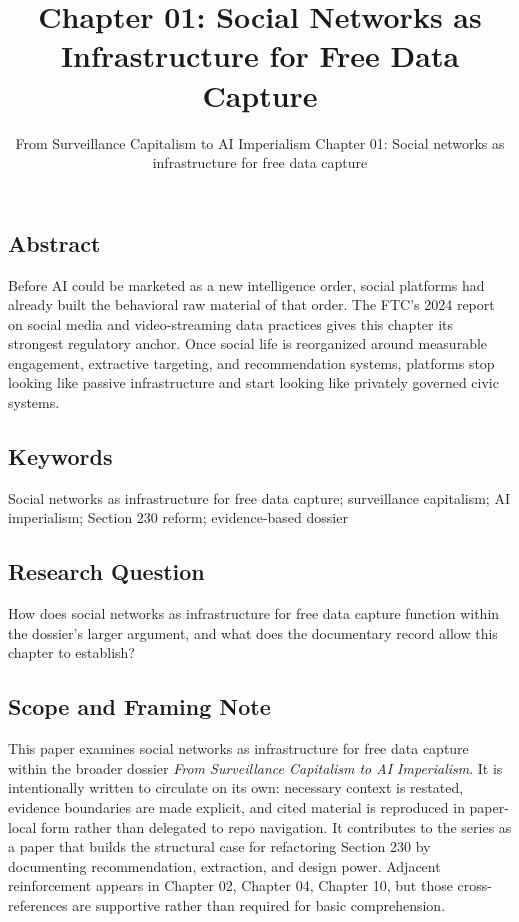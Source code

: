 \documentclass[
  american,
  11pt,
  letterpaper,
]{article}
\title{Chapter 01: Social Networks as Infrastructure for Free Data
Capture}
\subtitle{From Surveillance Capitalism to AI Imperialism \textbar{}
Chapter 01: Social networks as infrastructure for free data capture}
\author{}
\date{}
\begin{document}
\maketitle

\subsection{Abstract}\label{abstract}

Before AI could be marketed as a new intelligence order, social
platforms had already built the behavioral raw material of that order.
The FTC's 2024 report on social media and video-streaming data practices
gives this chapter its strongest regulatory anchor. Once social life is
reorganized around measurable engagement, extractive targeting, and
recommendation systems, platforms stop looking like passive
infrastructure and start looking like privately governed civic systems.

\subsection{Keywords}\label{keywords}

Social networks as infrastructure for free data capture; surveillance
capitalism; AI imperialism; Section 230 reform; evidence-based dossier

\subsection{Research Question}\label{research-question}

How does social networks as infrastructure for free data capture
function within the dossier's larger argument, and what does the
documentary record allow this chapter to establish?

\subsection{Scope and Framing Note}\label{scope-and-framing-note}

This paper examines social networks as infrastructure for free data
capture within the broader dossier \emph{From Surveillance Capitalism to
AI Imperialism}. It is intentionally written to circulate on its own:
necessary context is restated, evidence boundaries are made explicit,
and cited material is reproduced in paper-local form rather than
delegated to repo navigation. It contributes to the series as a paper
that builds the structural case for refactoring Section 230 by
documenting recommendation, extraction, and design power. Adjacent
reinforcement appears in Chapter 02, Chapter 04, Chapter 10, but those
cross-references are supportive rather than required for basic
comprehension.
\end{document}
